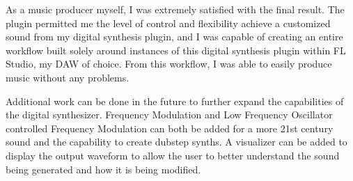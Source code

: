 \documentclass[a4paper,12pt]{report}
\begin{document}
As a music producer myself, I was extremely satisfied with the final result. The plugin permitted me the level of control and flexibility achieve a customized sound from my digital synthesis plugin, and I was capable of creating an entire workflow built solely around instances of this digital synthesis plugin within FL Studio, my DAW of choice. From this workflow, I was able to easily produce music without any problems.

Additional work can be done in the future to further expand the capabilities of the digital synthesizer. Frequency Modulation and Low Frequency Oscillator controlled Frequency Modulation can both be added for a more 21st century sound and the capability to create dubstep synths. A visualizer can be added to display the output waveform to allow the user to better understand the sound being generated and how it is being modified.
\end{document}
